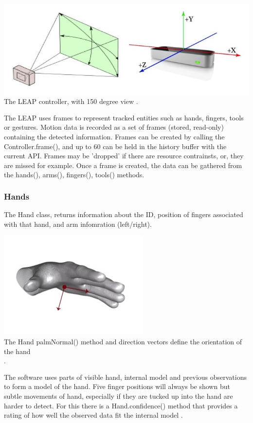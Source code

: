 \documentclass[10pt]{article}
\begin{document}
\begin{center}
\includegraphics[scale=0.5]{leap}\\
The LEAP controller, with 150 degree view \cite{leap}.
\end{center}

The LEAP uses frames to represent tracked entities such as hands, fingers, tools or gestures. Motion data is recorded as a set of frames (stored, read-only) containing the detected information. 
Frames can be created by calling the Controller.frame(), and up to 60 can be held in the history buffer with the current API. Frames may be 'dropped' if there are resource contrainsts, or, they are missed for example. Once a frame is created, the data can be gathered from the hands(), arms(), fingers(), tools() methods.

\subsubsection{Hands}
The Hand class, returns information about the ID, position of fingers associated with that hand, and arm infomration (left/right).

\begin{center}
\includegraphics[scale=0.6]{palm}\\
The Hand palmNormal() method and direction vectors define the orientation of the hand \cite{leap}\\.
\end{center}

The software uses parts of visible hand, internal model and previous observations to form a model of the hand. Five finger positions will always be shown but subtle movements of hand, especially if they are tucked up into the hand are harder to detect. For this there is a Hand.confidence() method that provides a rating of how well the observed data fit the internal model \cite{leap}.
\end{document}
